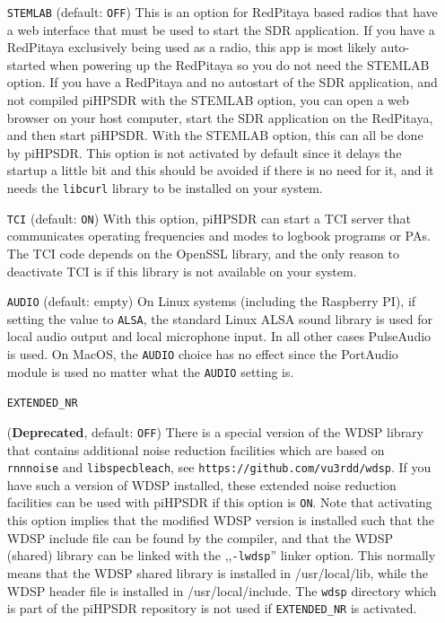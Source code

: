 \documentclass[12pt]{book}
\def\rett#1{\texttt{\color{red}#1}}
\def\pH{pi\-HPSDR\xspace}
\begin{document}
\begin{itemize}
\item[\rett{STEMLAB}] {(default: \texttt{OFF})
This is an option for RedPitaya based radios that have a web interface that must be used
to start the SDR application. If you have a RedPitaya exclusively being used as a radio, this
app is most likely auto-started when powering up the RedPitaya so you do not need the STEMLAB
option.
If you have a RedPitaya and no autostart of the SDR application, and not compiled \pH
with the STEMLAB option, you can open a web browser on your host computer, start the SDR application on the RedPitaya,
and then start \pH. With the STEMLAB option, this can all be done by \pH.
This option is not activated by default since it delays the startup a little bit  and  this should  be
avoided if  there is no need for it, and it needs the \texttt{libcurl}  library to be installed on your system.
}

\item[\rett{TCI}] {(default: \texttt{ON})
With this option,  \pH can start a TCI server that communicates operating frequencies
and modes to logbook programs or PAs. The TCI code depends on the OpenSSL library, and the only reason to
deactivate TCI is if  this library is  not available on your system.}

\item[\rett{AUDIO}] {(default: empty)
On Linux systems (including the Raspberry PI), if setting the value to \texttt{ALSA},
the standard Linux ALSA sound library is used for local audio
output and local microphone input. In all other cases
PulseAudio is used. On MacOS, the \texttt{AUDIO} choice has no effect since the PortAudio
module is used no matter what the \texttt{AUDIO} setting is.
}

\item[\rett{EXTENDED\_NR}] {(\textbf{Deprecated}, default: \texttt{OFF})
There is a special version of the WDSP library that contains additional noise
reduction facilities which are based on  \texttt{rnnnoise} and \texttt{libspecbleach}, see
 \texttt{https://github.com/vu3rdd/wdsp}. If you have such a version of WDSP installed, these
 extended noise reduction facilities can be used with \pH if this option is \texttt{ON}.
 Note that activating this option implies that the modified WDSP version is installed such
 that the WDSP include file can be found by the compiler, and that the WDSP (shared)
 library can be linked with the ,,\texttt{-lwdsp}'' linker option. This normally means
 that the WDSP shared library is installed in /usr/local/lib, while the WDSP header file
 is installed in /usr/local/include. The \texttt{wdsp} directory which is part of
 the \pH repository is not used if \texttt{EXTENDED\_NR} is activated.

}
\end{itemize}
\end{document}
